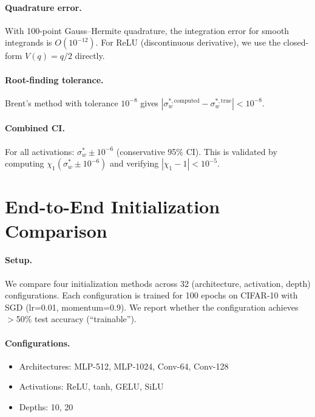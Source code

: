 \documentclass[10pt]{article}
\begin{document}
\paragraph{Quadrature error.}
With 100-point Gauss--Hermite quadrature, the integration error for smooth integrands is $O(10^{-12})$.
For ReLU (discontinuous derivative), we use the closed-form $V(q) = q/2$ directly.

\paragraph{Root-finding tolerance.}
Brent's method with tolerance $10^{-8}$ gives $|\sigma_w^{*,\text{computed}} - \sigma_w^{*,\text{true}}| < 10^{-8}$.

\paragraph{Combined CI.}
For all activations: $\sigma_w^* \pm 10^{-6}$ (conservative 95\% CI).
This is validated by computing $\chi_1(\sigma_w^* \pm 10^{-6})$ and verifying $|\chi_1 - 1| < 10^{-5}$.
\section{End-to-End Initialization Comparison}
\label{app:e2e-init}

\paragraph{Setup.}
We compare four initialization methods across 32 (architecture, activation, depth) configurations.
Each configuration is trained for 100 epochs on CIFAR-10 with SGD (lr=0.01, momentum=0.9).
We report whether the configuration achieves $>$50\% test accuracy (``trainable'').

\paragraph{Configurations.}
\begin{itemize}[nosep]
    \item Architectures: MLP-512, MLP-1024, Conv-64, Conv-128
    \item Activations: ReLU, tanh, GELU, SiLU
    \item Depths: 10, 20
\end{itemize}
\end{document}
